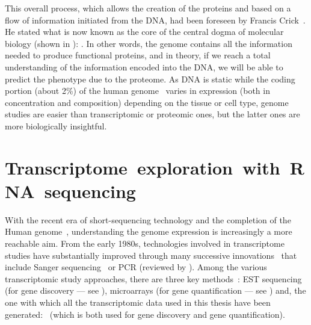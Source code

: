This overall process, which allows the creation of the proteins and
based on a flow of information initiated from the \gls{DNA},
had been foreseen by Francis Crick~.
He stated what is now known as the core of the central dogma of molecular biology
(shown in ):
.
In other words, the genome contains all the information needed to produce
functional proteins,
and in theory, if we reach a total understanding of the information encoded
into the \gls{DNA},
we will be able to predict the \gls{phenotype} due to the proteome.
As \gls{DNA} is static
while the coding portion (about 2\%) of the human genome~
varies in expression (both in concentration and composition)
depending on the tissue or cell type,
genome studies are easier than transcriptomic or proteomic ones,
but the latter ones are more biologically insightful.
\begin{comment}
There are different types of proteins: ubiquitous ones
(generally qualified as \emph{housekeeping}),
cell/tissue/condition specific ones and
everything in-between.
\end{comment}

\section[Transcriptome exploration with RNA sequencing]%
{Transcriptome~exploration~with~RNA~sequencing}\label{sec:transExplo}

With the recent era of short-sequencing technology and the completion of the
Human genome~,
understanding the genome expression is increasingly a more
reachable aim.
From the early 1980s,
technologies involved in transcriptome studies
have substantially improved through many successive innovations~
that include Sanger sequencing~ or
\gls{PCR} (reviewed by \citet{VanGuilder2008-xs}).
Among the various transcriptomic study approaches,
there are three key methods~:
\gls{EST} sequencing (for gene discovery --- see ),
microarrays (for gene quantification --- see )
and, the one with which all the transcriptomic data used in this thesis have
been generated:
\Rnaseq\ (which is both used for gene discovery and gene quantification).

